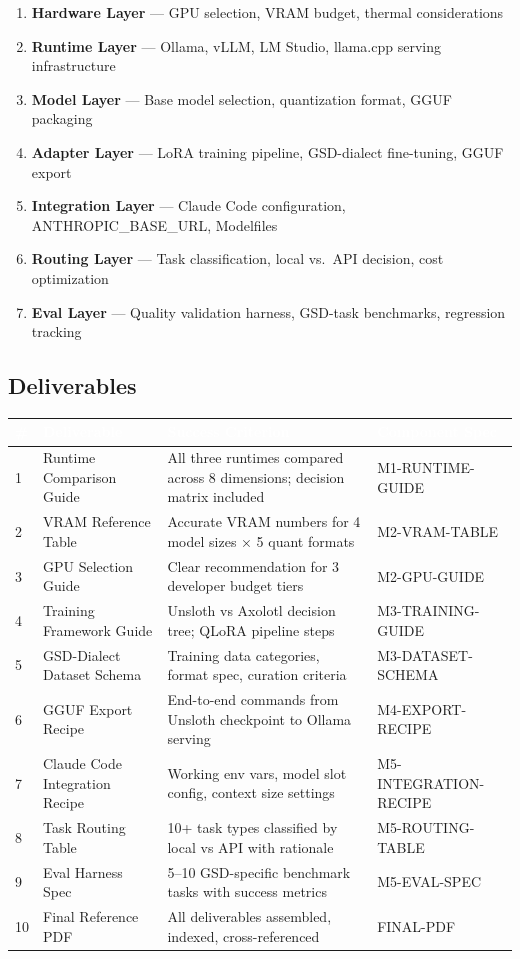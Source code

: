 \documentclass[11pt,letterpaper]{article}
\newcommand{\tableheader}[1]{\textbf{\sffamily\textcolor{white}{#1}}}
\begin{document}
\begin{enumerate}[leftmargin=*]
  \item \textbf{Hardware Layer} --- GPU selection, VRAM budget, thermal considerations
  \item \textbf{Runtime Layer} --- Ollama, vLLM, LM Studio, llama.cpp serving infrastructure
  \item \textbf{Model Layer} --- Base model selection, quantization format, GGUF packaging
  \item \textbf{Adapter Layer} --- LoRA training pipeline, GSD-dialect fine-tuning, GGUF export
  \item \textbf{Integration Layer} --- Claude Code configuration, ANTHROPIC\_BASE\_URL, Modelfiles
  \item \textbf{Routing Layer} --- Task classification, local vs.\ API decision, cost optimization
  \item \textbf{Eval Layer} --- Quality validation harness, GSD-task benchmarks, regression tracking
\end{enumerate}

\subsection{Deliverables}

\begin{center}
\begin{tabularx}{\textwidth}{C{0.5cm}L{3.5cm}L{3cm}X}
\toprule
{}
\tableheader{\#} & \tableheader{Deliverable} & \tableheader{Success Criterion} & \tableheader{Component Spec} \\
 & Runtime Comparison Guide & All three runtimes compared across 8 dimensions; decision matrix included & M1-RUNTIME-GUIDE \\
2 & VRAM Reference Table & Accurate VRAM numbers for 4 model sizes × 5 quant formats & M2-VRAM-TABLE \\
3 & GPU Selection Guide & Clear recommendation for 3 developer budget tiers & M2-GPU-GUIDE \\
4 & Training Framework Guide & Unsloth vs Axolotl decision tree; QLoRA pipeline steps & M3-TRAINING-GUIDE \\
5 & GSD-Dialect Dataset Schema & Training data categories, format spec, curation criteria & M3-DATASET-SCHEMA \\
6 & GGUF Export Recipe & End-to-end commands from Unsloth checkpoint to Ollama serving & M4-EXPORT-RECIPE \\
7 & Claude Code Integration Recipe & Working env vars, model slot config, context size settings & M5-INTEGRATION-RECIPE \\
8 & Task Routing Table & 10+ task types classified by local vs API with rationale & M5-ROUTING-TABLE \\
9 & Eval Harness Spec & 5--10 GSD-specific benchmark tasks with success metrics & M5-EVAL-SPEC \\
10 & Final Reference PDF & All deliverables assembled, indexed, cross-referenced & FINAL-PDF \\
\bottomrule
\end{tabularx}
\end{center}
\end{document}
